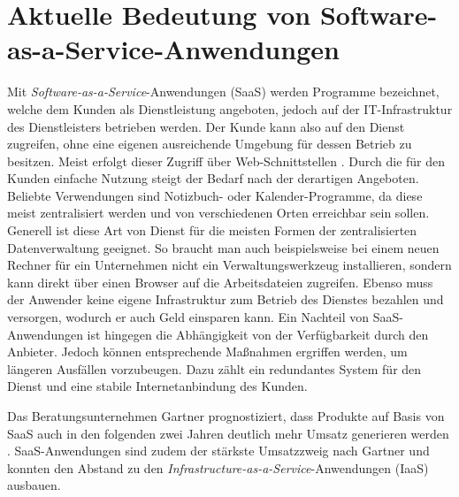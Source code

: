 
\chapter{Aktuelle Bedeutung von Software-as-a-Service-Anwendungen}

Mit \textit{Software-as-a-Service}-Anwendungen (SaaS) werden Programme bezeichnet, welche dem Kunden als Dienstleistung angeboten, jedoch auf der IT-Infrastruktur des Dienstleisters betrieben werden. Der Kunde kann also auf den Dienst zugreifen, ohne eine eigenen ausreichende Umgebung für dessen Betrieb zu besitzen. Meist erfolgt dieser Zugriff über Web-Schnittstellen \cite{McNee2007}. Durch die für den Kunden einfache Nutzung steigt der Bedarf nach der derartigen Angeboten. Beliebte Verwendungen sind Notizbuch- oder Kalender-Programme, da diese meist zentralisiert werden und von verschiedenen Orten erreichbar sein sollen. Generell ist diese Art von Dienst für die meisten Formen der zentralisierten Datenverwaltung geeignet. So braucht man auch beispielsweise bei einem neuen Rechner für ein Unternehmen nicht ein Verwaltungswerkzeug installieren, sondern kann direkt über einen Browser auf die Arbeitsdateien zugreifen. Ebenso muss der Anwender keine eigene Infrastruktur zum Betrieb des Dienstes bezahlen und versorgen, wodurch er auch Geld einsparen kann. Ein Nachteil von SaaS-Anwendungen ist hingegen die Abhängigkeit von der Verfügbarkeit durch den Anbieter. Jedoch können entsprechende Maßnahmen ergriffen werden, um längeren Ausfällen vorzubeugen. Dazu zählt ein redundantes System für den Dienst und eine stabile Internetanbindung des Kunden.

Das Beratungsunternehmen Gartner prognostiziert, dass Produkte auf Basis von SaaS auch in den folgenden zwei Jahren deutlich mehr Umsatz generieren werden \cite{Gartner2019}. SaaS-Anwendungen sind zudem der stärkste Umsatzzweig nach Gartner und konnten den Abstand zu den \textit{Infrastructure-as-a-Service}-Anwendungen (IaaS) ausbauen.


